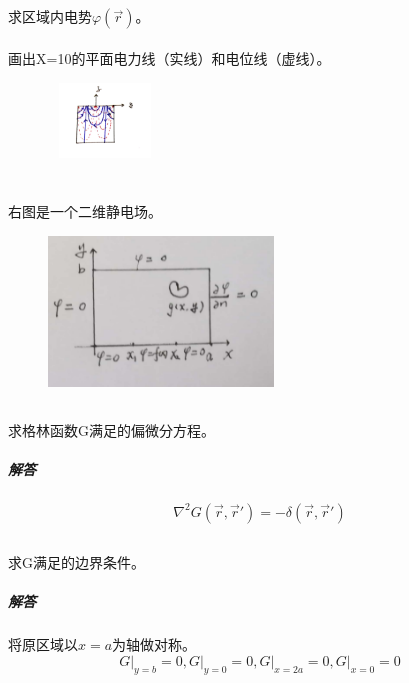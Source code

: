 \documentclass[UTF8]{ctexart}
\begin{document}
\subsection{}
\paragraph{}
求区域内电势$\varphi(\vec r)$。
\paragraph{}
画出X=10的平面电力线（实线）和电位线（虚线）。
\begin{figure}[H]
\includegraphics[width=3cm,height=2cm]{2018-5.jpg}
\centering
\end{figure}
\section{}
右图是一个二维静电场。
\begin{figure}[htbp]
\includegraphics[width=6cm,height=4cm]{2018-6.jpg}
\centering
\end{figure}
\subsection{}
\paragraph{}
求格林函数G满足的偏微分方程。
\subparagraph{解答}
\[\nabla^2G(\vec r,\vec r')=-\delta(\vec r,\vec r')\]
\subsection{}
\paragraph{}
求G满足的边界条件。
\subparagraph{解答}
将原区域以$x=a$为轴做对称。
\[G\lvert_{y=b}=0, G\lvert_{y=0}=0, G\lvert_{x=2a}=0, G\lvert_{x=0}=0\]
\end{document}
